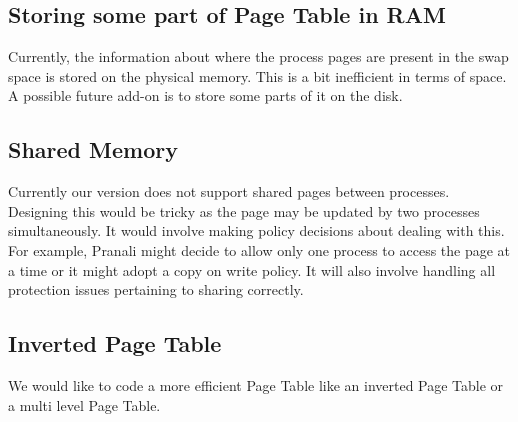 \documentclass[paper=a4, fontsize=11pt,twoside]{scrartcl}   %
\begin{document}
   \subsection{Storing some part of Page Table in RAM}
   Currently, the information about where the process pages are present in the swap space is stored on the physical memory. This is a bit inefficient in terms of space. A possible future add-on is to store some parts of it on the disk.
   
   \subsection{Shared Memory}
   Currently our version does not support shared pages between processes. Designing this would be tricky as the page may be updated by two processes simultaneously. It would involve making policy decisions about dealing with this. For example, Pranali might decide to allow only one process to access the page at a time or it might adopt a copy on write policy. It will also involve handling all protection issues pertaining to sharing correctly.

   \subsection{Inverted Page Table}   
 We would like to code a more efficient Page Table like an inverted Page Table or a multi level Page Table.

\end{document}
